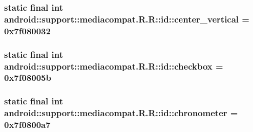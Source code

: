 \hypertarget{classandroid_1_1support_1_1mediacompat_1_1_r_1_1id_263b9b6ae052004296cb37658649a67d}{
\subsubsection[{center\_\-vertical}]{\setlength{\rightskip}{0pt plus 5cm}static final int android::support::mediacompat.R.R::id::center\_\-vertical = 0x7f080032}}
\label{classandroid_1_1support_1_1mediacompat_1_1_r_1_1id_263b9b6ae052004296cb37658649a67d}


\hypertarget{classandroid_1_1support_1_1mediacompat_1_1_r_1_1id_b0d69a04dcb58d0a19b3c982ed394eb7}{
\subsubsection[{checkbox}]{\setlength{\rightskip}{0pt plus 5cm}static final int android::support::mediacompat.R.R::id::checkbox = 0x7f08005b}}
\label{classandroid_1_1support_1_1mediacompat_1_1_r_1_1id_b0d69a04dcb58d0a19b3c982ed394eb7}


\hypertarget{classandroid_1_1support_1_1mediacompat_1_1_r_1_1id_ddc20b5b5d5710409d30e5902505e2bb}{
\subsubsection[{chronometer}]{\setlength{\rightskip}{0pt plus 5cm}static final int android::support::mediacompat.R.R::id::chronometer = 0x7f0800a7}}
\label{classandroid_1_1support_1_1mediacompat_1_1_r_1_1id_ddc20b5b5d5710409d30e5902505e2bb}



